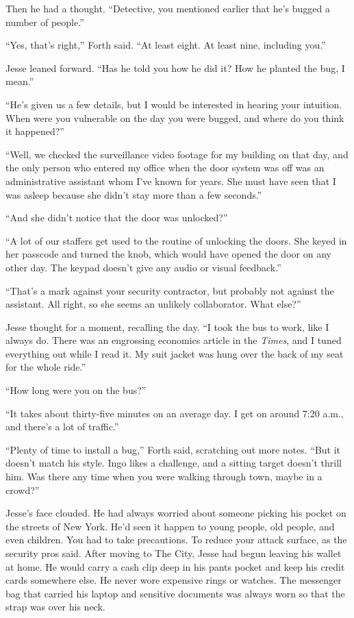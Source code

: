 \documentclass[12pt]{book}
\begin{document}
Then he had a thought.  ``Detective, you mentioned earlier that he's bugged a number of people.''

``Yes, that's right,'' Forth said.  ``At least eight.  At least nine, including you.''

Jesse leaned forward.  ``Has he told you how he did it?  How he planted the bug, I mean.''

``He's given us a few details, but I would be interested in hearing your intuition.  When were you vulnerable on the day you were bugged, and where do you think it happened?''

``Well, we checked the surveillance video footage for my building on that day, and the only person who entered my office when the door system was off was an administrative assistant whom I've known for years.  She must have seen that I was asleep because she didn't stay more than a few seconds.''

``And she didn't notice that the door was unlocked?''

``A lot of our staffers get used to the routine of unlocking the doors.  She keyed in her passcode and turned the knob, which would have opened the door on any other day.  The keypad doesn't give any audio or visual feedback.''

``That's a mark against your security contractor, but probably not against the assistant.  All right, so she seems an unlikely collaborator.  What else?''

Jesse thought for a moment, recalling the day.  ``I took the bus to work, like I always do.  There was an engrossing economics article in the \emph{Times}, and I tuned everything out while I read it.  My suit jacket was hung over the back of my seat for the whole ride.''

``How long were you on the bus?''

``It takes about thirty-five minutes on an average day.  I get on around 7:20 a.m., and there's a lot of traffic.''

``Plenty of time to install a bug,'' Forth said, scratching out more notes.  ``But it doesn't match his style.  Ingo likes a challenge, and a sitting target doesn't thrill him.  Was there any time when you were walking through town, maybe in a crowd?''

Jesse's face clouded.  He had always worried about someone picking his pocket on the streets of New York.  He'd seen it happen to young people, old people, and even children.  You had to take precautions.  To reduce your attack surface, as the security pros said.  After moving to The City, Jesse had begun leaving his wallet at home.  He would carry a cash clip deep in his pants pocket and keep his credit cards somewhere else.  He never wore expensive rings or watches.  The messenger bag that carried his laptop and sensitive documents was always worn so that the strap was over his neck.
\end{document}
